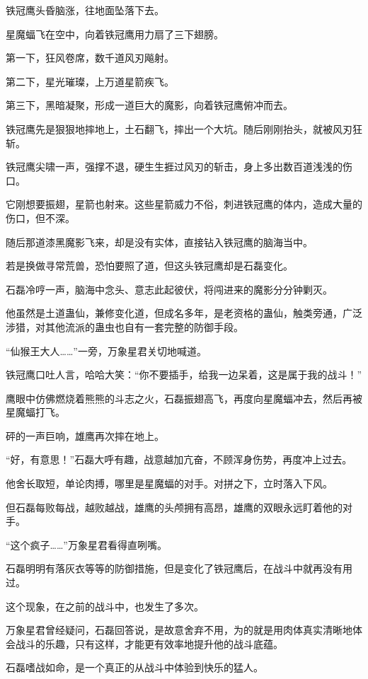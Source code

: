 \begin{this_body}
铁冠鹰头昏脑涨，往地面坠落下去。

星魔蝠飞在空中，向着铁冠鹰用力扇了三下翅膀。

第一下，狂风卷席，数千道风刃飚射。

第二下，星光璀璨，上万道星箭疾飞。

第三下，黑暗凝聚，形成一道巨大的魔影，向着铁冠鹰俯冲而去。

铁冠鹰先是狠狠地摔地上，土石翻飞，摔出一个大坑。随后刚刚抬头，就被风刃狂斩。

铁冠鹰尖啸一声，强撑不退，硬生生捱过风刃的斩击，身上多出数百道浅浅的伤口。

它刚想要振翅，星箭也射来。这些星箭威力不俗，刺进铁冠鹰的体内，造成大量的伤口，但不深。

随后那道漆黑魔影飞来，却是没有实体，直接钻入铁冠鹰的脑海当中。

若是换做寻常荒兽，恐怕要照了道，但这头铁冠鹰却是石磊变化。

石磊冷哼一声，脑海中念头、意志此起彼伏，将闯进来的魔影分分钟剿灭。

他虽然是土道蛊仙，兼修变化道，但成名多年，是老资格的蛊仙，触类旁通，广泛涉猎，对其他流派的蛊虫也自有一套完整的防御手段。

“仙猴王大人……”一旁，万象星君关切地喊道。

铁冠鹰口吐人言，哈哈大笑：“你不要插手，给我一边呆着，这是属于我的战斗！”

鹰眼中仿佛燃烧着熊熊的斗志之火，石磊振翅高飞，再度向星魔蝠冲去，然后再被星魔蝠打飞。

砰的一声巨响，雄鹰再次摔在地上。

“好，有意思！”石磊大呼有趣，战意越加亢奋，不顾浑身伤势，再度冲上过去。

他舍长取短，单论肉搏，哪里是星魔蝠的对手。对拼之下，立时落入下风。

但石磊每败每战，越败越战，雄鹰的头颅拥有高昂，雄鹰的双眼永远盯着他的对手。

“这个疯子……”万象星君看得直咧嘴。

石磊明明有落灰衣等等的防御措施，但是变化了铁冠鹰后，在战斗中就再没有用过。

这个现象，在之前的战斗中，也发生了多次。

万象星君曾经疑问，石磊回答说，是故意舍弃不用，为的就是用肉体真实清晰地体会战斗的乐趣，只有这样，才能更有效率地提升他的战斗底蕴。

石磊嗜战如命，是一个真正的从战斗中体验到快乐的猛人。


\end{this_body}

